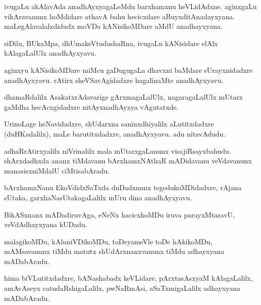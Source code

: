 \documentclass{article}
\begin{document}
\begin{mn}
ivugaLu akAlavAda anadhAyxyagaLeMdu barxhamxnu heVLidAdxne. aginxgaLu vikAravanunx hoMdidare athavA
bahu hecicxdare aBuyxditAnadayxyana. maLegAlavalalxdidudx moVDa kANisikoMDare aMdU anadhayxyana.
\end{mn}

\begin{mn}
siDilu, BUkaMpa, dhUmakeVtudashaRna, ivugaLu kANisidare elAlx kAlagaLalUlx anadhAyxyavu.
\end{mn}

\begin{mn}
aginxyu kANisikoMDare miMcu gaDugugaLa dhavxni baMdare sUrayxnidadxre anadhAyxyavu. rAtirx 
sheVSavAgidadxre hagalinaMte anadhAyxyavu.
\end{mn}

\begin{mn}
dhamaRdalilx AsakatxrAdavarige gArxmagaLalUlx, nagaragaLalUlx mUtarx gaMdha hecAcxgidadxre 
nitAyxnadhAyxya vAgutatxde.
\end{mn}

\begin{mn}
UrinoLage heNavidadxre, shUdarxna saninxdhiyalilx aLutitxdadxre (duHKadalilx), maLe 
barutitxdadxre, anadhAyxyavu. adu nitavAdudu.
\end{mn}

\begin{mn}
adhaRrAtirxyalilx niVrinalilx mala mUtarxgaLanunx  visajiRsayxbahudu. shArxdadhxda ananx tiMdavanu 
bArxhamxNAthaR mADidavanu veVdavanunx manasisxniMdalU ciMtisabAradu.
\end{mn}

\begin{mn}
bArxhamxNanu EkoVdidxSaTxda duDadxnunx tegedukoMDidadxre, rAjana sUtaka, garxhaNasUtakagaLalilx
mUru dina anadhAyxyavu. 
\end{mn}

\begin{mn}
BikASxnanx mADadiruvAga, eNeNx hacicxkoMDu iruva parayxMtaravU, veVdAdhayxyana kUDadu.
\end{mn}

\begin{mn}
malagikoMDu, kAluniVDikoMDu, toDeyameVle toDe hAkikoMDu, mAMsavanunx tiMdu matutx 
shUdArxnanxvanunx tiMdu adhayxyana mADabAradu.
\end{mn}

\begin{mn}
hima biVLutitxdadxre, bANashabadx keVLidare, pArxtasAsxyaM kAlagaLalilx, amAvAseyx 
catudaRshigaLalilx, pwNaRmAsi, aSaTxmigaLalilx adhayxyana mADabAradu.
\end{mn}
\end{document}
